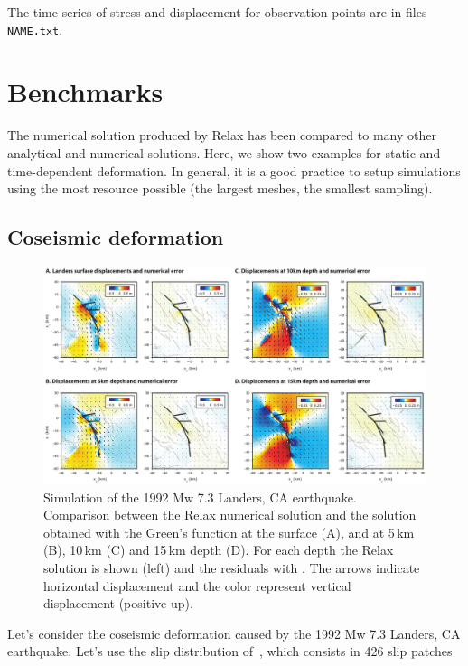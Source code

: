 \documentclass[10pt]{article}
\begin{document}
The time series of stress and displacement for observation points are in files \verb'NAME.txt'.







\pagebreak
\section{Benchmarks}

The numerical solution produced by Relax has been compared to many other analytical and numerical solutions. Here, we show two examples for static and time-dependent deformation. In general, it is a good practice to setup simulations using the most resource possible (the largest meshes, the smallest sampling).

\subsection{Coseismic deformation}
%
\begin{figure}[h]
\centering
\includegraphics[width=\textwidth]{bm_landers.pdf}
\caption{\small Simulation of the 1992 Mw 7.3 Landers, CA earthquake. Comparison between the Relax numerical solution and the solution obtained with the \cite{okada92} Green's function at the surface (A), and at 5\,km (B), 10\,km (C) and 15\,km depth (D). For each depth the Relax solution is shown (left) and the residuals with \cite{okada92}. The arrows indicate horizontal displacement and the color represent vertical displacement (positive up). }
\label{fig:bm_landers}
\end{figure}
%
Let's consider the coseismic deformation caused by the 1992 Mw 7.3 Landers, CA earthquake. Let's use the slip distribution of~\citep{fialko04c}, which consists in 426 slip patches
\end{document}
